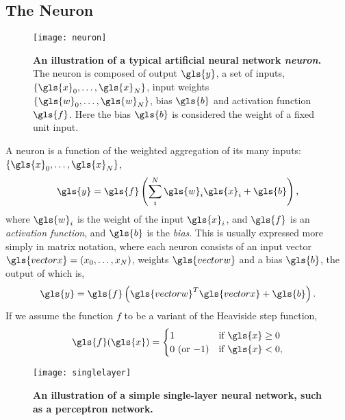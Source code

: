 \documentclass[thesis]{subfiles}
\begin{document}
\subsection{The Neuron}

\begin{figure}[tbp]
\centering
\texttt{[image: neuron]}
\caption[An illustration of a typical artificial neural network neuron]{\textbf{An illustration of a typical artificial neural network \emph{neuron}.} The neuron is composed of output $\gls{y}$, a set of inputs, $\{\gls{x}_0, \ldots, \gls{x}_N\}$, input weights $\{\gls{w}_0, \ldots, \gls{w}_N\}$, bias $\gls{b}$ and activation function $\gls{f}$. Here the bias $\gls{b}$ is considered the weight of a fixed unit input.}
\label{fig:neuron}
\end{figure}
A neuron is a function of the weighted aggregation of its many inputs: $\left\{\gls{x}_0,\ldots,\gls{x}_N\right\}$,
%
\begin{equation}
	\gls{y} = \gls{f}\left(\sum_{i}^{N} \gls{w}_i \gls{x}_i + \gls{b}\right),
\end{equation}
%
where $\gls{w}_i$ is the weight of the input $\gls{x}_i$, and $\gls{f}$ is an \emph{activation function}, and $\gls{b}$ is the \emph{bias}. This is usually expressed more simply in matrix notation, where each neuron consists of an input vector $\gls{vectorx}=(x_0,\ldots,x_N)$, weights $\gls{vectorw}$ and a bias $\gls{b}$, the output of which is, %
%
\begin{equation}
    \gls{y} = \gls{f}\left(\gls{vectorw}^T\gls{vectorx} + \gls{b} \right).
\end{equation}
%
If we assume the function $f$ to be a variant of the Heaviside step function,
\begin{equation}
    \gls{f}(\gls{x}) = 
\begin{cases}
1 & \text{if } \gls{x} \geq 0\\
0 \textrm{ (or $-1$)} & \text{if } \gls{x} < 0,
\end{cases}
\end{equation}
%
\begin{figure}[tbp]
\centering
\texttt{[image: singlelayer]}
\caption[A single-layer neural network]{\textbf{An illustration of a simple single-layer neural network, such as a perceptron network.}}
\label{fig:singlelayer}
\end{figure}
\end{document}
